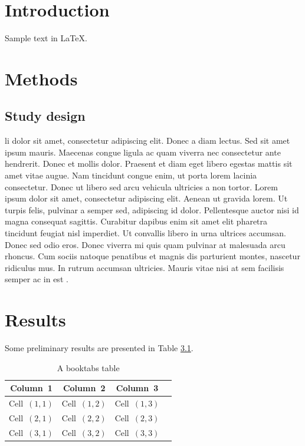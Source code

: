 \chapter{Introduction}

Sample text in \LaTeX.

\chapter{Methods}

\section{Study design}


\gls{li} dolor sit amet, consectetur adipiscing elit. Donec a diam lectus. Sed sit amet ipsum mauris. Maecenas congue ligula ac quam viverra nec consectetur ante hendrerit. Donec et mollis dolor. Praesent et diam eget libero egestas mattis sit amet vitae augue. Nam tincidunt congue enim, ut porta lorem lacinia consectetur. Donec ut libero sed arcu vehicula ultricies a non tortor. Lorem ipsum dolor sit amet, consectetur adipiscing elit. Aenean ut gravida lorem. Ut turpis felis, pulvinar a semper sed, adipiscing id dolor. Pellentesque auctor nisi id magna consequat sagittis. Curabitur dapibus enim sit amet elit pharetra tincidunt feugiat nisl imperdiet. Ut convallis libero in urna ultrices accumsan. Donec sed odio eros. Donec viverra mi quis quam pulvinar at malesuada arcu rhoncus. Cum sociis natoque penatibus et magnis dis parturient montes, nascetur ridiculus mus. In rutrum accumsan ultricies. Mauris vitae nisi at sem facilisis semper ac in est \citep{cicero1839}.

\chapter{Results}

Some preliminary results are presented in Table \ref{tab:sample_table}.

\begin{table}
	\centering
	\caption{A booktabs table}
	\label{tab:sample_table}
	\begin{tabular}{c c c c}
		\toprule
		\bfseries{Column~1} & \bfseries{Column~2} & \bfseries{Column~3} \\
		\midrule
		Cell~$(1,1)$                   & Cell~$(1,2)$                   & Cell~$(1,3)$                   \\
		Cell~$(2,1)$                   & Cell~$(2,2)$                   & Cell~$(2,3)$                   \\
		Cell~$(3,1)$                   & Cell~$(3,2)$                   & Cell~$(3,3)$                   \\
		\bottomrule
	\end{tabular}
\end{table}

